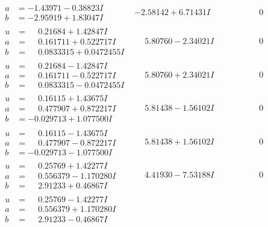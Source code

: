 \documentclass[1p]{elsarticle_modified}
\theoremstyle{definition}
\begin{document}
$$\begin{array}{c|c|c}
\begin{aligned}
a &= -1.43971 - 0.38823 I \\
b &= -2.95919 + 1.83047 I\end{aligned}
 & -2.58142 + 6.71431 I & \phantom{-0.000000 } 0 \\ \hline\begin{aligned}
u &= \phantom{-}0.21684 + 1.42847 I \\
a &= \phantom{-}0.161711 + 0.522717 I \\
b &= \phantom{-}0.0833315 + 0.0472455 I\end{aligned}
 & \phantom{-}5.80760 - 2.34021 I & \phantom{-0.000000 } 0 \\ \hline\begin{aligned}
u &= \phantom{-}0.21684 - 1.42847 I \\
a &= \phantom{-}0.161711 - 0.522717 I \\
b &= \phantom{-}0.0833315 - 0.0472455 I\end{aligned}
 & \phantom{-}5.80760 + 2.34021 I & \phantom{-0.000000 } 0 \\ \hline\begin{aligned}
u &= \phantom{-}0.16115 + 1.43675 I \\
a &= \phantom{-}0.477907 + 0.872217 I \\
b &= -0.029713 + 1.077500 I\end{aligned}
 & \phantom{-}5.81438 - 1.56102 I & \phantom{-0.000000 } 0 \\ \hline\begin{aligned}
u &= \phantom{-}0.16115 - 1.43675 I \\
a &= \phantom{-}0.477907 - 0.872217 I \\
b &= -0.029713 - 1.077500 I\end{aligned}
 & \phantom{-}5.81438 + 1.56102 I & \phantom{-0.000000 } 0 \\ \hline\begin{aligned}
u &= \phantom{-}0.25769 + 1.42277 I \\
a &= \phantom{-}0.556379 - 1.170280 I \\
b &= \phantom{-}2.91233 + 0.46867 I\end{aligned}
 & \phantom{-}4.41930 - 7.53188 I & \phantom{-0.000000 } 0 \\ \hline\begin{aligned}
u &= \phantom{-}0.25769 - 1.42277 I \\
a &= \phantom{-}0.556379 + 1.170280 I \\
b &= \phantom{-}2.91233 - 0.46867 I\end{aligned}

\end{array}$$
\end{document}
